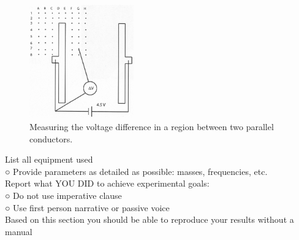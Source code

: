 \documentclass[letterpaper]{article}
\begin{document}
\begin{figure}[H]
  \centering
  \includegraphics[width=0.4\textwidth]{fig3.jpg}
  \caption{Measuring the voltage difference in a region between two parallel conductors. \cite{labmanual}}
\end{figure}
List all equipment used\\
○ Provide parameters as detailed as
possible: masses, frequencies,
etc.\\
Report what YOU DID to achieve
experimental goals:\\
○ Do not use imperative clause\\
○ Use first person narrative or
passive voice\\
Based on this section you should be
able to reproduce your results without a
manual

%
%
\end{document}

